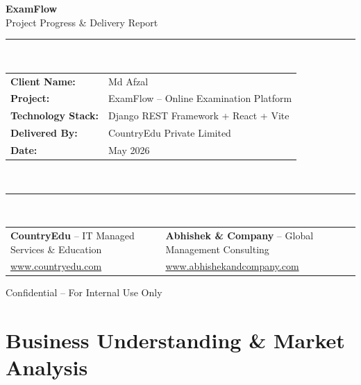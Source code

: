 \documentclass[12pt,a4paper]{article}
\begin{document}
\begin{titlepage}
  \centering
  \vspace*{1.5cm}

  {\Huge\bfseries\color{primaryblue} ExamFlow}\\[0.4cm]
  {\Large\color{accentgray} Project Progress \& Delivery Report}\\[1.2cm]

  \rule{\linewidth}{1pt}\\[0.5cm]
  \begin{tabular}{ll}
    \textbf{Client Name:}       & Md Afzal \\[4pt]
    \textbf{Project:}           & ExamFlow -- Online Examination Platform \\[4pt]
    \textbf{Technology Stack:}  & Django REST Framework + React + Vite \\[4pt]
    \textbf{Delivered By:}      & CountryEdu Private Limited \\[4pt]
    \textbf{Date:}              & May 2026 \\
  \end{tabular}\\[0.5cm]
  \rule{\linewidth}{1pt}\\[1.2cm]

  \begin{tabular}{>{}p{7cm} >{}p{7cm}}
    \textbf{CountryEdu} -- IT Managed Services \& Education &
    \textbf{Abhishek \& Company} -- Global Management Consulting \\
    \url{www.countryedu.com} & \url{www.abhishekandcompany.com} \\
  \end{tabular}

  \vfill
  {\small\color{accentgray} Confidential -- For Internal Use Only}
\end{titlepage}

\tableofcontents
\newpage


\section{Business Understanding \& Market Analysis}
\end{document}
